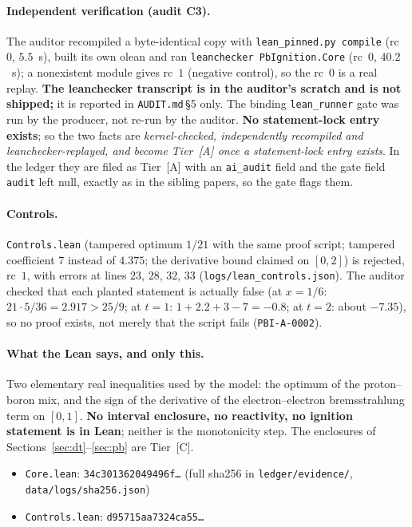 \documentclass[10pt]{article}
\newcommand{\tier}[1]{\textsf{[#1]}}
\newcommand{\tA}{\tier{A}}
\newcommand{\tC}{\tier{C}}
\begin{document}
\paragraph{Independent verification (audit C3).} The auditor recompiled a byte-identical copy with \texttt{lean\_pinned.py compile} (rc~$0$, $5.5$~s), built its own olean and ran \texttt{leanchecker PbIgnition.Core} (rc~$0$, $40.2$~s); a nonexistent module gives rc~$1$ (negative control), so the rc~$0$ is a real replay. \textbf{The leanchecker transcript is in the auditor's scratch and is not shipped;} it is reported in \texttt{AUDIT.md}\,\S5 only. The binding \texttt{lean\_runner} gate was run by the producer, not re-run by the auditor. \textbf{No statement-lock entry exists}; so the two facts are \emph{kernel-checked, independently recompiled and leanchecker-replayed, and become Tier~\tA{} once a statement-lock entry exists}. In the ledger they are filed as Tier~\tA{} with an \texttt{ai\_audit} field and the gate field \texttt{audit} left null, exactly as in the sibling papers, so the gate flags them.
\paragraph{Controls.} \texttt{Controls.lean} (tampered optimum $1/21$ with the same proof script; tampered coefficient $7$ instead of $4.375$; the derivative bound claimed on $[0,2]$) is rejected, rc~$1$, with errors at lines $23$, $28$, $32$, $33$ (\texttt{logs/lean\_controls.json}). The auditor checked that each planted statement is actually false (at $x=1/6$: $21\cdot5/36=2.917>25/9$; at $t=1$: $1+2.2+3-7=-0.8$; at $t=2$: about $-7.35$), so no proof exists, not merely that the script fails (\texttt{PBI-A-0002}).
\paragraph{What the Lean says, and only this.} Two elementary real inequalities used by the model: the optimum of the proton--boron mix, and the sign of the derivative of the electron--electron bremsstrahlung term on $[0,1]$. \textbf{No interval enclosure, no reactivity, no ignition statement is in Lean}; neither is the monotonicity step. The enclosures of Sections~\ref{sec:dt}--\ref{sec:pb} are Tier~\tC{}.
\begin{itemize}\scriptsize\itemsep=0pt
\item \texttt{Core.lean}: \texttt{34c301362049496f\dots} (full sha256 in \texttt{ledger/evidence/}, \texttt{data/logs/sha256.json})
\item \texttt{Controls.lean}: \texttt{d95715aa7324ca55\dots}
\end{itemize}
\end{document}
